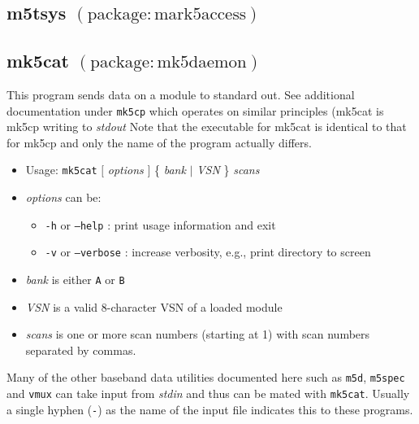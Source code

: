 
\subsection{m5tsys {\small $\mathrm{(package: mark5access)}$}} \label{sec:tsysal}








\subsection{mk5cat {\small $\mathrm{(package: mk5daemon)}$}} \label{sec:mk5cat}

This program sends data on a module to standard out.
See additional documentation under {\tt mk5cp} which operates on similar principles (mk5cat is mk5cp writing to {\em stdout}
Note that the executable for mk5cat is identical to that for mk5cp and only the name of the program actually differs.

\begin{itemize}
\item[] Usage: {\tt mk5cat} $[$ {\em options} $]$ \{ {\em bank} $\mid$ {\em VSN} \} {\em scans}
\item[] {\em options} can be:
\begin{itemize}
\item[] {\tt -h} or {\tt --help} : print usage information and exit
\item[] {\tt -v} or {\tt --verbose} : increase verbosity, e.g., print directory to screen
\end{itemize}
\item[] {\em bank} is either {\tt A} or {\tt B}
\item[] {\em VSN} is a valid 8-character VSN of a loaded module
\item[] {\em scans} is one or more scan numbers (starting at 1) with scan numbers separated by commas.
\end{itemize}

Many of the other baseband data utilities documented here such as {\tt m5d}, {\tt m5spec} and {\tt vmux} can take input from {\em stdin} and thus can be mated with {\tt mk5cat}.
Usually a single hyphen ({\tt -}) as the name of the input file indicates this to these programs.

